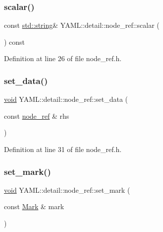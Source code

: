 \subsubsection{\texorpdfstring{scalar()}{scalar()}}
{\footnotesize\ttfamily const \mbox{\hyperlink{glad_8h_ac83513893df92266f79a515488701770}{std\+::string}}\& Y\+A\+M\+L\+::detail\+::node\+\_\+ref\+::scalar (\begin{DoxyParamCaption}{ }\end{DoxyParamCaption}) const\hspace{0.3cm}{\ttfamily [inline]}}



Definition at line 26 of file node\+\_\+ref.\+h.

\mbox{\label{class_y_a_m_l_1_1detail_1_1node__ref_a3deae49d4f6537d4e012a78c2cf1e4e6}} 
\subsubsection{\texorpdfstring{set\_data()}{set\_data()}}
{\footnotesize\ttfamily \mbox{\hyperlink{glad_8h_a950fc91edb4504f62f1c577bf4727c29}{void}} Y\+A\+M\+L\+::detail\+::node\+\_\+ref\+::set\+\_\+data (\begin{DoxyParamCaption}\item[{const \mbox{\hyperlink{class_y_a_m_l_1_1detail_1_1node__ref}{node\+\_\+ref}} \&}]{rhs }\end{DoxyParamCaption})\hspace{0.3cm}{\ttfamily [inline]}}



Definition at line 31 of file node\+\_\+ref.\+h.

\mbox{\label{class_y_a_m_l_1_1detail_1_1node__ref_ab12783133274395f017d7d8f4ce992a3}} 
\subsubsection{\texorpdfstring{set\_mark()}{set\_mark()}}
{\footnotesize\ttfamily \mbox{\hyperlink{glad_8h_a950fc91edb4504f62f1c577bf4727c29}{void}} Y\+A\+M\+L\+::detail\+::node\+\_\+ref\+::set\+\_\+mark (\begin{DoxyParamCaption}\item[{const \mbox{\hyperlink{struct_y_a_m_l_1_1_mark}{Mark}} \&}]{mark }\end{DoxyParamCaption})\hspace{0.3cm}{\ttfamily [inline]}}




